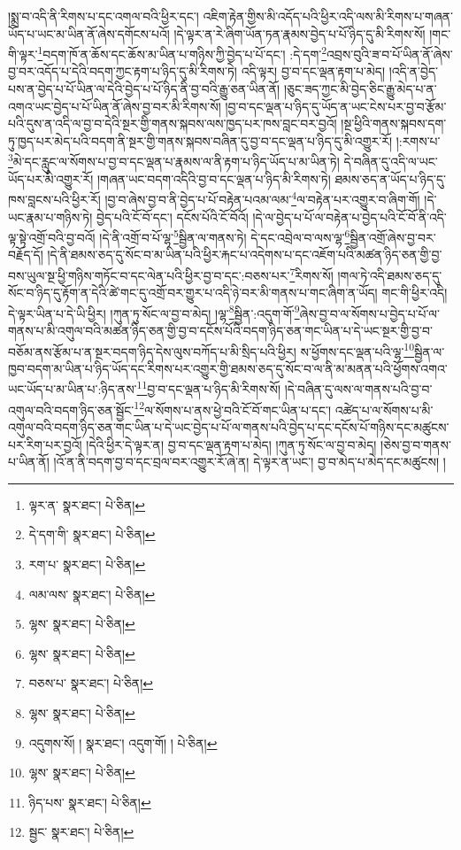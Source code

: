 །སྨྲ་བ་འདི་ནི་རིགས་པ་དང་འགལ་བའི་ཕྱིར་དང་། འཇིག་རྟེན་གྱིས་མི་འདོད་པའི་ཕྱིར་འདི་ལས་མི་རིགས་པ་གཞན་ཡོད་པ་ཡང་མ་ཡིན་ནོ་ཞེས་དགོངས་པའོ། །དེ་ལྟར་ན་རེ་ཞིག་ཡོན་ཏན་རྣམས་བྱེད་པ་པོ་ཉིད་དུ་མི་རིགས་སོ། །གང་གི་ལྟར་\footnote{ལྟར་ན་  སྣར་ཐང་།  པེ་ཅིན། }བདག་ཁོ་ན་ཆོས་དང་ཆོས་མ་ཡིན་པ་གཉིས་ཀྱི་བྱེད་པ་པོ་དང་། :དེ་དག་\footnote{དེ་དག་གི་  སྣར་ཐང་།  པེ་ཅིན། }འབྲས་བུའི་ཟ་བ་པོ་ཡིན་ནོ་ཞེས་བྱ་བར་འདོད་པ་དེའི་བདག་ཀྱང་རྟག་པ་ཉིད་དུ་མི་རིགས་ཏེ། འདི་ལྟར། བྱ་བ་དང་ལྡན་རྟག་པ་མེད། །འདི་ན་བྱེད་པས་ན་བྱེད་པ་པོ་ཡིན་ལ་དེའི་བྱེད་པ་པོ་ཉིད་ནི་བྱ་བའི་རྒྱུ་ཅན་ཡིན་ནོ། །ཅུང་ཟད་ཀྱང་མི་བྱེད་ཅིང་རྒྱུ་མེད་པ་ན་འགའ་ཡང་བྱེད་པ་པོ་ཡིན་ནོ་ཞེས་བྱ་བར་མི་རིགས་སོ། །བྱ་བ་དང་ལྡན་པ་ཉིད་དུ་ཡོད་ན་ཡང་ངེས་པར་བྱ་བ་རྩོམ་པའི་དུས་ན་འདི་ལ་བྱ་བ་དེའི་སྔར་གྱི་གནས་སྐབས་ལས་ཁྱད་པར་ཁས་བླང་བར་བྱའོ། །སྔ་ཕྱིའི་གནས་སྐབས་དག་ཏུ་ཁྱད་པར་མེད་པའི་བདག་ནི་སྔར་གྱི་གནས་སྐབས་བཞིན་དུ་བྱ་བ་དང་ལྡན་པ་ཉིད་དུ་མི་འགྱུར་རོ། །:རགས་པ་\footnote{རག་པ་  སྣར་ཐང་།  པེ་ཅིན། }མེ་དང་རླུང་ལ་སོགས་པ་བྱ་བ་དང་ལྡན་པ་རྣམས་ལ་ནི་རྟག་པ་ཉིད་ཡོད་པ་མ་ཡིན་ཏེ། དེ་བཞིན་དུ་འདི་ལ་ཡང་ཡོད་པར་མི་འགྱུར་རོ། །གཞན་ཡང་བདག་འདིའི་བྱ་བ་དང་ལྡན་པ་ཉིད་མི་རིགས་ཏེ། ཐམས་ཅད་ན་ཡོད་པ་ཉིད་དུ་ཁས་བླངས་པའི་ཕྱིར་རོ། །བྱ་བ་ཞེས་བྱ་བ་ནི་བྱེད་པ་པོ་བརྟེན་པའམ་ལམ་\footnote{ལམ་ལས་  སྣར་ཐང་།  པེ་ཅིན། }ལ་བརྟེན་པར་འགྱུར་བ་ཞིག་གོ། །དེ་ཡང་རྣམ་པ་གཉིས་ཏེ། བྱེད་པའི་ངོ་བོ་དང་། དངོས་པོའི་ངོ་བོའོ། །དེ་ལ་བྱེད་པ་པོ་ལ་བརྟེན་པ་བྱེད་པའི་ངོ་བོ་ནི་འདི་ལྟ་སྟེ་འགྲོ་བའི་བྱ་བའོ། །དེ་ནི་འགྲོ་བ་པོ་ལྷ་\footnote{ལྷས་  སྣར་ཐང་།  པེ་ཅིན། }སྦྱིན་ལ་གནས་ཏེ། དེ་དང་འབྲེལ་བ་ལས་ལྷ་\footnote{ལྷས་  སྣར་ཐང་།  པེ་ཅིན། }སྦྱིན་འགྲོ་ཞེས་བྱ་བར་བརྗོད་དོ། །དེ་ནི་ཐམས་ཅད་དུ་སོང་བ་མ་ཡིན་པའི་ཕྱིར་རྐང་པ་འདེགས་པ་དང་འཇོག་པའི་མཚན་ཉིད་ཅན་གྱི་བྱ་བས་ཡུལ་སྔ་ཕྱི་གཉིས་གཏོང་བ་དང་ལེན་པའི་ཕྱིར་བྱ་བ་དང་:བཅས་པར་\footnote{བཅས་པ་  སྣར་ཐང་།  པེ་ཅིན། }རིགས་སོ། །གལ་ཏེ་འདི་ཐམས་ཅད་དུ་སོང་བ་ཉིད་དུ་རྟོག་ན་དེའི་ཚེ་གང་དུ་འགྲོ་བར་གྱུར་པ་འདི་ཉེ་བར་མི་གནས་པ་གང་ཞིག་ན་ཡོད། གང་གི་ཕྱིར་འདི། དེ་ལྟར་ཡིན་པ་དེ་ཡི་ཕྱིར། །ཀུན་ཏུ་སོང་ལ་བྱ་བ་མེད། །ལྷ་\footnote{ལྷས་  སྣར་ཐང་།  པེ་ཅིན། }སྦྱིན་:འདུག་གོ་\footnote{འདུགས་སོ། །  སྣར་ཐང་། འདུག་གོ། །  པེ་ཅིན། }ཞེས་བྱ་བ་ལ་སོགས་པ་བྱེད་པ་པོ་ལ་གནས་པ་མི་འགུལ་བའི་མཚན་ཉིད་ཅན་གྱི་བྱ་བ་དངོས་པོའི་བདག་ཉིད་ཅན་གང་ཡིན་པ་དེ་ཡང་སྔར་གྱི་བྱ་བ་བཅོམ་ནས་རྩོམ་པ་ན་སྔར་བདག་ཉིད་དེས་ལུས་བཀོད་པ་མི་སྲིད་པའི་ཕྱིར། ས་ཕྱོགས་དང་ལྡན་པའི་ལྷ་\footnote{ལྷས་  སྣར་ཐང་།  པེ་ཅིན། }སྦྱིན་ལ་ཁྱབ་བདག་མ་ཡིན་པ་ཉིད་ཡོད་དང་རིགས་པར་འགྱུར་གྱི་ཐམས་ཅད་དུ་སོང་བ་ལ་ནི་མ་མནན་པའི་ཕྱོགས་འགའ་ཡང་ཡོད་པ་མ་ཡིན་པ་:ཉིད་ནས་\footnote{ཉིད་པས་  སྣར་ཐང་།  པེ་ཅིན། }བྱ་བ་དང་ལྡན་པ་ཉིད་མི་རིགས་སོ། །དེ་བཞིན་དུ་ལས་ལ་གནས་པའི་བྱ་བ་འགུལ་བའི་བདག་ཉིད་ཅན་སྦྱོང་\footnote{སྦྱང་  སྣར་ཐང་།  པེ་ཅིན། }ལ་སོགས་པ་ནས་ཕྱེ་བའི་ངོ་བོ་གང་ཡིན་པ་དང་། འཚེད་པ་ལ་སོགས་པ་མི་འགུལ་བའི་བདག་ཉིད་ཅན་གང་ཡིན་པ་དེ་ཡང་བྱེད་པ་པོ་ལ་གནས་པའི་བྱེད་པ་དང་དངོས་པོ་གཉིས་དང་མཚུངས་པར་རིག་པར་བྱའོ། །དེའི་ཕྱིར་དེ་ལྟར་ན། བྱ་བ་དང་ལྡན་རྟག་པ་མེད། །ཀུན་ཏུ་སོང་ལ་བྱ་བ་མེད། །ཅེས་བྱ་བ་གནས་པ་ཡིན་ནོ། །འོ་ན་ནི་བདག་བྱ་བ་དང་བྲལ་བར་འགྱུར་རོ་ཞེ་ན། དེ་ལྟར་ན་ཡང་། བྱ་བ་མེད་པ་མེད་དང་མཚུངས། །
